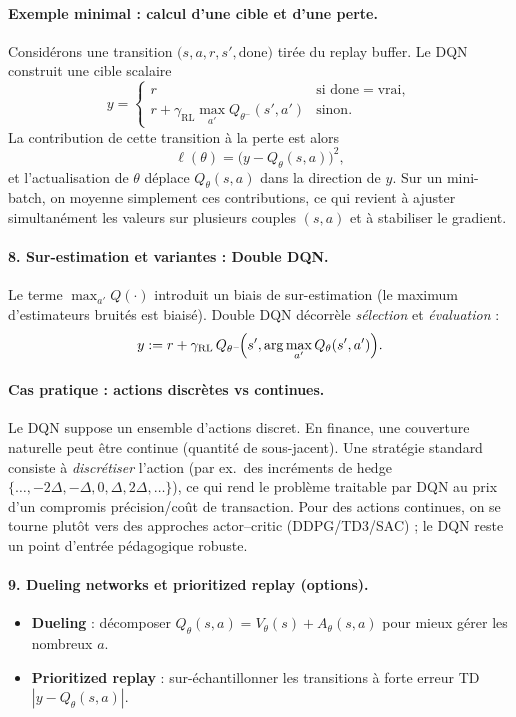 \documentclass[11pt,a4paper]{article}
\newcommand{\1}{\mathbf{1}}
\begin{document}
\paragraph{Exemple minimal : calcul d'une cible et d'une perte.}
Consid\'erons une transition $\bigl(s,a,r,s',\mathrm{done}\bigr)$ tir\'ee du replay buffer.
Le DQN construit une cible scalaire
\[
y =
\begin{cases}
r & \text{si }\mathrm{done}=\text{vrai},\\
r + \gamma_{\mathrm{RL}}\max_{a'}Q_{\theta^-}(s',a') & \text{sinon.}
\end{cases}
\]
La contribution de cette transition \`a la perte est alors
\[
\ell(\theta)=\bigl(y - Q_\theta(s,a)\bigr)^2,
\]
et l'actualisation de $\theta$ d\'eplace $Q_\theta(s,a)$ dans la direction de $y$.
Sur un mini-batch, on moyenne simplement ces contributions, ce qui revient \`a ajuster simultan\'ement
les valeurs sur plusieurs couples $(s,a)$ et \`a stabiliser le gradient.

\paragraph{8. Sur-estimation et variantes : Double DQN.}
Le terme $\max_{a'}Q(\cdot)$ introduit un biais de sur-estimation (le maximum d'estimateurs bruit\'es est biais\'e).
Double DQN d\'ecorr\`ele \emph{s\'election} et \emph{\'evaluation} :
\[
y := r + \gamma_{\mathrm{RL}}\, Q_{\theta^-}\!\Bigl(s', \arg\max_{a'} Q_\theta(s',a')\Bigr).
\]

\paragraph{Cas pratique : actions discr\`etes vs continues.}
Le DQN suppose un ensemble d'actions discret. En finance, une couverture naturelle peut \^etre continue (quantit\'e de sous-jacent).
Une strat\'egie standard consiste \`a \emph{discr\'etiser} l'action (par ex.\ des incr\'ements de hedge $\{\ldots,-2\Delta,-\Delta,0,\Delta,2\Delta,\ldots\}$),
ce qui rend le probl\`eme traitable par DQN au prix d'un compromis pr\'ecision/co\^ut de transaction.
Pour des actions continues, on se tourne plut\^ot vers des approches actor--critic (DDPG/TD3/SAC) ; le DQN reste un point d'entr\'ee p\'edagogique robuste.

\paragraph{9. Dueling networks et prioritized replay (options).}
\begin{itemize}
  \item \textbf{Dueling} : d\'ecomposer $Q_\theta(s,a)=V_\theta(s)+A_\theta(s,a)$ pour mieux g\'erer les nombreux $a$.
  \item \textbf{Prioritized replay} : sur-\'echantillonner les transitions \`a forte erreur TD $|y-Q_\theta(s,a)|$.
\end{itemize}
\end{document}
